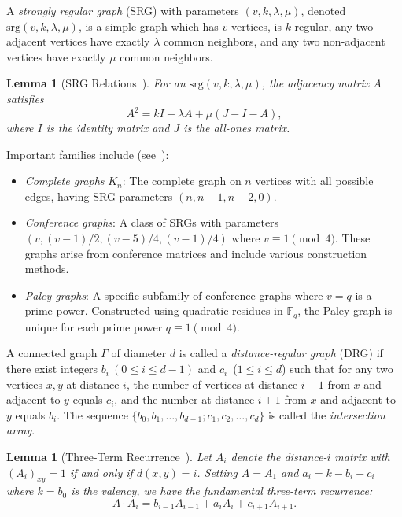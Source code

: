 \documentclass[a4paper,11pt]{article}
\newtheorem{lemma}[theorem]{Lemma}
\theoremstyle{remark}
\newcommand{\FF}{\mathbb{F}}
\begin{document}
A \emph{strongly regular graph} (SRG) with parameters $(v,k,\lambda,\mu)$, denoted $\text{srg}(v,k,\lambda,\mu)$, is a simple graph which has $v$ vertices, is $k$-regular, any two adjacent vertices have exactly $\lambda$ common neighbors, and any two non-adjacent vertices have exactly $\mu$ common neighbors.

\begin{lemma}[SRG Relations{~\cite[Theorem 9.1.2]{brouwerhaemers2012}}]\label{lem:srg-relations}
For an $\text{srg}(v,k,\lambda,\mu)$, the adjacency matrix $A$ satisfies
\[
A^2 = kI + \lambda A + \mu(J - I - A),
\]
where $I$ is the identity matrix and $J$ is the all-ones matrix.
\end{lemma}

Important families include (see~\cite[Chapter~9]{brouwerhaemers2012}):
\begin{itemize}
\item \emph{Complete graphs} $K_n$: The complete graph on $n$ vertices with all possible edges, having SRG parameters $(n,n-1,n-2,0)$.
\item \emph{Conference graphs}: A class of SRGs with parameters $(v,(v-1)/2,(v-5)/4,(v-1)/4)$ where $v \equiv 1 \pmod 4$. These graphs arise from conference matrices and include various construction methods.
\item \emph{Paley graphs}: A specific subfamily of conference graphs where $v = q$ is a prime power. Constructed using quadratic residues in $\FF_q$, the Paley graph is unique for each prime power $q \equiv 1 \pmod 4$.
\end{itemize}

A connected graph $\Gamma$ of diameter $d$ is called a \emph{distance-regular graph} (DRG) if there exist integers $b_i\ (0 \le i \le d-1)$ and $c_i$\ ($1 \leq i \leq d$) such that for any two vertices $x, y$ at distance $i$, the number of vertices at distance $i-1$ from $x$ and adjacent to $y$ equals $c_i$, and the number at distance $i+1$ from $x$ and adjacent to $y$ equals $b_i$.
The sequence $\{b_0, b_1, \ldots, b_{d-1}; c_1, c_2, \ldots, c_d\}$ is called the \emph{intersection array}.

\begin{lemma}[Three-Term Recurrence{~\cite[Proposition 2.71]{bannai2016}}]\label{lem:three-term}
Let $A_i$ denote the distance-$i$ matrix with $(A_i)_{xy} = 1$ if and only if $d(x,y) = i$. Setting $A=A_1$ and  $a_i = k - b_i - c_i$ where $k = b_0$ is the valency, we have the fundamental three-term recurrence:
\[
A \cdot A_i = b_{i-1}A_{i-1} + a_i A_i + c_{i+1}A_{i+1}.
\]
\end{lemma}
\end{document}
